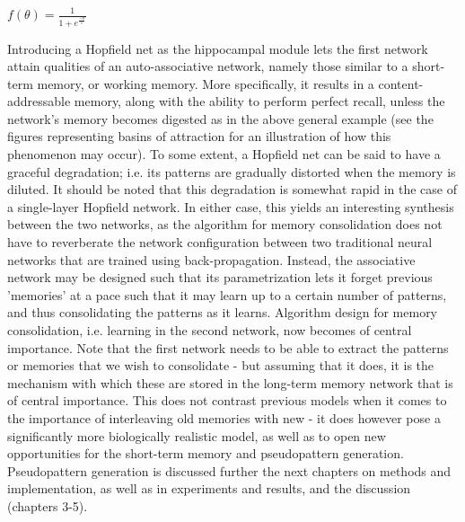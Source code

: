 \begin{center}
\begin{math}
    f(\theta) = \frac{1}{1 + e^{\frac{-\theta}{\epsilon}}}
\end{math}
\end{center}

Introducing a Hopfield net as the hippocampal module lets the first network attain qualities of an auto-associative network, namely those similar to a short-term memory, or working memory. More specifically, it results in a content-addressable memory, along with the ability to perform perfect recall, unless the network's memory becomes digested as in the above general example (see the figures representing basins of attraction for an illustration of how this phenomenon may occur).
To some extent, a Hopfield net can be said to have a graceful degradation; i.e. its patterns are gradually distorted when the memory is diluted. It should be noted that this degradation is somewhat rapid in the case of a single-layer Hopfield network. In either case, this yields an interesting synthesis between the two networks, as the algorithm for memory consolidation does not have to reverberate the network configuration between two traditional neural networks that are trained using back-propagation. Instead, the associative network may be designed such that its parametrization lets it forget previous 'memories' at a pace such that it may learn up to a certain number of patterns, and thus consolidating the patterns as it learns. Algorithm design for memory consolidation, i.e. learning in the second network, now becomes of central importance. Note that the first network needs to be able to extract the patterns or memories that we wish to consolidate - but assuming that it does, it is the mechanism with which these are stored in the long-term memory network that is of central importance. This does not contrast previous models when it comes to the importance of interleaving old memories with new - it does however pose a significantly more biologically realistic model, as well as to open new opportunities for the short-term memory and pseudopattern generation. Pseudopattern generation is discussed further the next chapters on methods and implementation, as well as in experiments and results, and the discussion (chapters 3-5).

